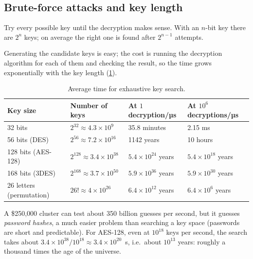 \subsection{Brute-force attacks and key length}

\begin{definition}
Try every possible key until the decryption makes sense. With an $n$-bit key there are $2^n$ keys; on average the right one is found after $2^{n-1}$ attempts.
\end{definition}

Generating the candidate keys is easy; the cost is running the decryption algorithm for each of them and checking the result, so the time grows exponentially with the key length (\cref{tab:bruteforce}).

\begin{table}[H]
\centering
\caption{Average time for exhaustive key search.}
\label{tab:bruteforce}
\begin{tabular}{@{}llll@{}}
\toprule
Key size & Number of keys & At $1$ decryption/µs & At $10^6$ decryptions/µs \\
\midrule
32 bits & $2^{32} \approx 4.3 \times 10^{9}$ & 35.8 minutes & 2.15 ms \\
56 bits (DES) & $2^{56} \approx 7.2 \times 10^{16}$ & 1142 years & 10 hours \\
128 bits (AES-128) & $2^{128} \approx 3.4 \times 10^{38}$ & $5.4 \times 10^{24}$ years & $5.4 \times 10^{18}$ years \\
168 bits (3DES) & $2^{168} \approx 3.7 \times 10^{50}$ & $5.9 \times 10^{36}$ years & $5.9 \times 10^{30}$ years \\
26 letters (permutation) & $26! \approx 4 \times 10^{26}$ & $6.4 \times 10^{12}$ years & $6.4 \times 10^{6}$ years \\
\bottomrule
\end{tabular}
\end{table}

\begin{example}
A \$250,000 cluster can test about 350 billion guesses per second, but it guesses \emph{password hashes}, a much easier problem than searching a key space (passwords are short and predictable). For AES-128, even at $10^{18}$ keys per second, the search takes about $3.4 \times 10^{38} / 10^{18} \approx 3.4 \times 10^{20}$~s, i.e.\ about $10^{13}$ years: roughly a thousand times the age of the universe.
\end{example}


